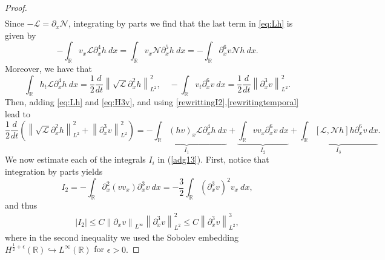 \documentclass[10pt,a4paper]{amsart}
\newcommand{\RR}{\mathbb R}
\newcommand{\norm}[1]{\left\| #1 \right\|}
\newcommand{\pa}{\partial}
\begin{document}
\begin{proof}
\begin{align}
\end{align}
Since $-\mathscr{L}=\pa_{x}\mathscr{N}$, integrating by parts we find that the last term in \eqref{eq:Lh} is given by
\begin{equation}\label{rewrittingI2}
 - \int_{\RR} v_{x} \mathscr{L}\pa_{x}^{4}h \  dx=\int_{\RR} v_{x} \mathscr{N}\pa_{x}^{5}h \  dx= -\int_{\RR} \pa_{x}^{6} v \mathscr{N}h \ dx .   
 \end{equation}
Moreover, we have that
\begin{equation}\label{rewritingtemporal}
\int_{\RR} h_{t}\mathscr{L}\pa_{x}^{4}h  \  dx=\frac{1}{2}\frac{d}{dt}\norm{\sqrt{\mathscr{L}}\pa_{x}^{2}h} ^{2}_{L^{2}}, \quad  -\int_{\RR} v_{t} \pa_{x}^{6}v\  dx=  \frac{1}{2}\frac{d}{dt}\norm{\pa_{x}^{3}v}^{2}_{L^{2}}.
\end{equation}
Then, adding \eqref{eq:Lh} and \eqref{eq:H3v}, and using \eqref{rewrittingI2},\eqref{rewritingtemporal} lead to
\begin{equation}\label{adg13}
\frac{1}{2}\frac{d}{dt}\left( \norm{\sqrt{\mathscr{L}}\pa_{x}^{2}h}_{L^{2}}^{2}+ \norm{\pa_{x}^{3}v}_{L^{2}}^{2} \right) =\underbrace{ -\int_{\RR}(hv)_{x} \mathscr{L}\pa_{x}^{4}h \ dx}_{I_{1}}+\underbrace{\int_{\RR}vv_{x} \pa_{x}^{6}v \ dx}_{I_{2}}+\underbrace{\int_{\RR}[\mathscr{L}, \mathscr{N}h] h \pa_{x}^{6}v  \ dx}_{I_{3}}.
\end{equation}
We now estimate each of the integrals $I_{i}$ in (\ref{adg13}).
First, notice that integration by parts yields 
\begin{equation*}
I_{2}=-\int_{\RR} \pa_{x}^{2}(vv_{x})\pa_{x}^{3}v  \  dx =-\frac{3}{2}\int_{\RR}(\pa_{x}^{3}v)^{2} v_{x} \  dx,
\end{equation*}
and thus
\begin{align}\label{est:I2}
|I_{2}|\leq C  \norm{\pa_{x}v}_{L^{\infty}}\norm{\pa_{x}^{3}v}^{2}_{L^{2}}\leq  C \norm{\pa_{x}^{3}v}^{3}_{L^{2}},
\end{align}
where in the second inequality we used the Sobolev embedding $H^{\frac{1}{2}+\epsilon}(\RR)\hookrightarrow L^{\infty}(\RR)$ for $\epsilon>0.$


\end{proof}
\end{document}
